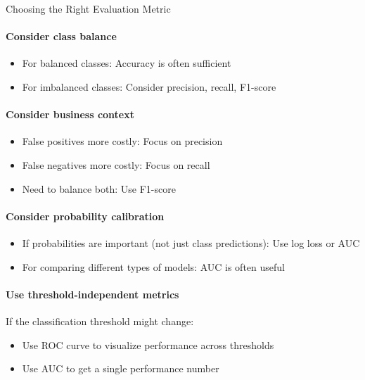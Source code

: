 \begin{KR}{Choosing the Right Evaluation Metric}
\paragraph{Consider class balance}
\begin{itemize}
    \item For balanced classes: Accuracy is often sufficient
    \item For imbalanced classes: Consider precision, recall, F1-score
\end{itemize}

\paragraph{Consider business context}
\begin{itemize}
    \item False positives more costly: Focus on precision
    \item False negatives more costly: Focus on recall
    \item Need to balance both: Use F1-score
\end{itemize}

\paragraph{Consider probability calibration}
\begin{itemize}
    \item If probabilities are important (not just class predictions): Use log loss or AUC
    \item For comparing different types of models: AUC is often useful
\end{itemize}

\paragraph{Use threshold-independent metrics}
If the classification threshold might change:
\begin{itemize}
    \item Use ROC curve to visualize performance across thresholds
    \item Use AUC to get a single performance number
\end{itemize}
\end{KR}

